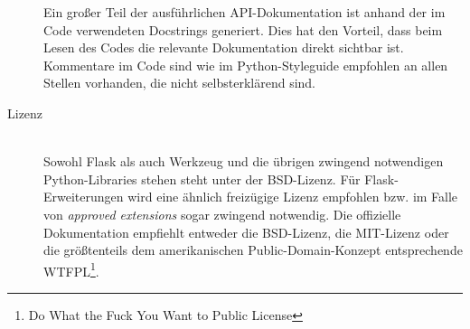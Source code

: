 \begin{description}
Ein großer Teil der ausführlichen API-Dokumentation ist anhand der im Code verwendeten Docstrings
generiert. Dies hat den Vorteil, dass beim Lesen des Codes die relevante Dokumentation direkt
sichtbar ist. Kommentare im Code sind wie im Python-Styleguide empfohlen an allen Stellen vorhanden,
die nicht selbsterklärend sind.

\newpage
\item[Lizenz] \hfill \\
Sowohl Flask als auch Werkzeug und die übrigen zwingend notwendigen Python-Libraries stehen steht
unter der BSD-Lizenz. Für Flask-Erweiterungen wird eine ähnlich freizügige Lizenz empfohlen bzw. im
Falle von \emph{approved extensions} sogar zwingend notwendig. Die offizielle Dokumentation
empfiehlt entweder die BSD-Lizenz, die MIT-Lizenz oder die größtenteils dem amerikanischen
Public-Domain-Konzept entsprechende WTFPL\footnote{Do What the Fuck You Want to Public License}.
\end{description}
